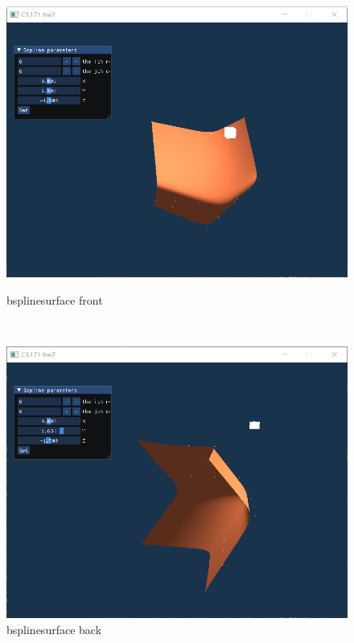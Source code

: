 \documentclass[acmtog]{acmart}
\begin{document}
\begin{figure}[h]
\begin{minipage}[b]{.4\linewidth}
	\end{minipage}
	\\
	\begin{minipage}[b]{.4\linewidth}
		\includegraphics[scale=0.25]{bsplinesurface.png}
		\caption{bsplinesurface front}
	\end{minipage}
	\\
	\begin{minipage}[b]{.4\linewidth}
		\includegraphics[scale=0.25]{bsplinesurface2.png}
		\caption{bsplinesurface back}
	\end{minipage}
\end{figure}
\end{document}
